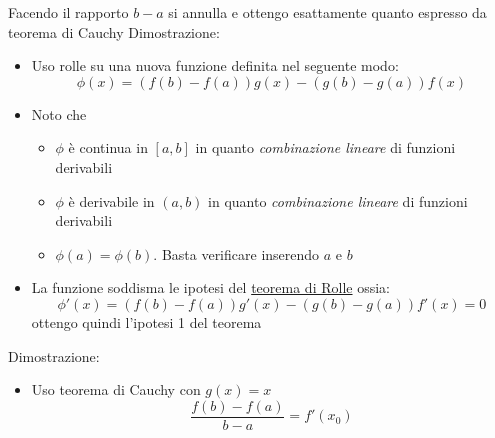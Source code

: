 Facendo il rapporto $  b-a $ si annulla e ottengo esattamente quanto espresso da teorema di Cauchy
\vskip3mm
Dimostrazione:
\begin{itemize}
	\item Uso rolle su una nuova funzione definita nel seguente modo:
	\[
	\phi \left( x \right) = \left( f\left( b \right) -f\left( a \right)  \right) g\left( x \right) - \left( g\left( b \right) -g\left( a \right)  \right) f\left( x \right) 
	\] 
	\item Noto che 
	\begin{itemize}
		\item $\phi $ è continua in $\left[ a,b \right] $ in quanto \textit{combinazione lineare }di funzioni derivabili
		\item $\phi $ è derivabile in $ \left( a,b \right) $ in quanto \textit{combinazione lineare }di funzioni derivabili
		\item $\phi\left( a \right) = \phi \left( b \right)  $. Basta verificare inserendo $a$ e $b$
	\end{itemize}
\item La funzione soddisma le ipotesi del \underline{teorema di Rolle} ossia:
\[
	\phi' \left( x \right) = \left( f\left( b \right) -f\left( a \right)  \right) g'\left( x \right) - \left( g\left( b \right) -g\left( a \right)  \right) f'\left( x \right) =0
\] 
ottengo quindi l'ipotesi 1 del teorema
\end{itemize}
Dimostrazione:
\begin{itemize}
	\item Uso teorema di Cauchy con $g\left( x \right) =x$
	\[
	\frac{f\left( b \right) -f\left( a \right) }{b-a}=f'\left( x_0 \right) 
	\] 
\end{itemize}
